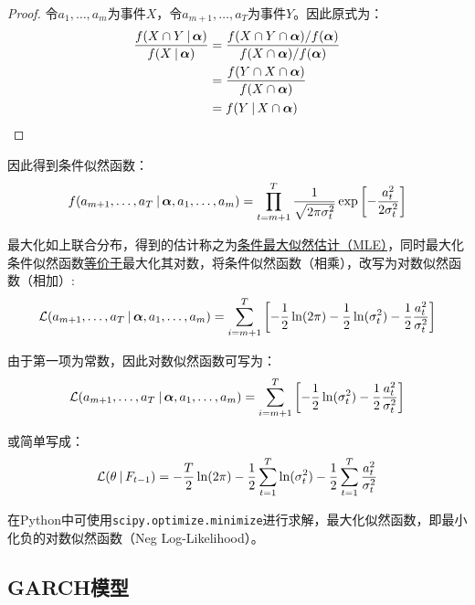 \documentclass[11pt]{article}
\begin{document}
\begin{proof}
    令$a_1,\dots,a_m$为事件$X$，令$a_{m+1},\dots,a_T$为事件$Y$。因此原式为：
    \begin{align*}
        \frac{f( X \cap Y \:\vert\, \bm{\alpha})}{f(X \:\vert\, \bm{\alpha})} 
        &= \frac{f( X \cap Y \cap \bm{\alpha}) / f(\bm{\alpha}) }{f(X \cap \bm{\alpha}) / f(\bm{\alpha})} \\
        &= \frac{f( Y \cap X \cap \bm{\alpha})}{f(X \cap \bm{\alpha})} \\
        &= f(Y \:\vert\, X \cap \bm{\alpha})
    \end{align*}
\end{proof}

因此得到条件似然函数：
\begin{equation*}
    f(a_{m+1},\dots,a_T \:\vert\, \bm{\alpha},a_1,\dots,a_m) =
    \prod_{t=m+1}^{T} \frac{1}{\sqrt{2\pi\sigma_{t}^{2}}} \exp \left[ -\frac{a_{t}^{2}}{2\sigma_{t}^{2}} \right]
\end{equation*}

最大化如上联合分布，得到的估计称之为\uline{条件最大似然估计（MLE）}，同时最大化条件似然函数\uline{等价于}最大化其对数，将条件似然函数（相乘），改写为对数似然函数（相加）:
\begin{equation*}
    \mathcal{L}(a_{m+1},\dots,a_T \:\vert\, \bm{\alpha},a_1,\dots,a_m)
    = \sum_{i=m+1}^{T} \left[ -\frac{1}{2}\ln(2\pi) - \frac{1}{2} \ln(\sigma_{t}^{2}) - \frac{1}{2} \frac{a_{t}^{2}}{\sigma_{t}^{2}} \right]
\end{equation*}

由于第一项为常数，因此对数似然函数可写为：
\begin{equation*}
    \mathcal{L}(a_{m+1},\dots,a_T \:\vert\, \bm{\alpha},a_1,\dots,a_m) =
    \sum_{i=m+1}^{T} \left[ - \frac{1}{2} \ln(\sigma_{t}^{2}) - \frac{1}{2} \frac{a_{t}^{2}}{\sigma_{t}^{2}} \right]
\end{equation*}

或简单写成：
\begin{equation*}
    \mathcal{L}(\theta \:\vert\, F_{t-1})
    = -\frac{T}{2}\ln(2\pi) - \frac{1}{2} \sum_{t=1}^{T} \ln(\sigma_{t}^{2}) - \frac{1}{2} \sum_{t=1}^{T} \frac{a_{t}^{2}}{\sigma_{t}^{2}}
\end{equation*}

在Python中可使用\verb|scipy.optimize.minimize|进行求解，最大化似然函数，即最小化负的对数似然函数（Neg Log-Likelihood）。

\subsection{GARCH模型}
\end{document}
